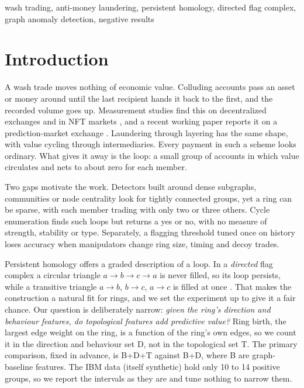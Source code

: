 \documentclass[conference]{IEEEtran}
\begin{document}
\begin{IEEEkeywords}
wash trading, anti-money laundering, persistent homology, directed flag complex, graph anomaly detection, negative results
\end{IEEEkeywords}

\section{Introduction}
\label{sec:intro}

A wash trade moves nothing of economic value. Colluding accounts pass an asset or money around until the last recipient hands it back to the first, and the recorded volume goes up. Measurement studies find this on decentralized exchanges and in NFT markets \cite{victor2021wash,tosic2025beyond,liu2023nft}, and a recent working paper reports it on a prediction-market exchange \cite{sirolly2025network}. Laundering through layering has the same shape, with value cycling through intermediaries. Every payment in such a scheme looks ordinary. What gives it away is the loop: a small group of accounts in which value circulates and nets to about zero for each member.

Two gaps motivate the work. Detectors built around dense subgraphs, communities or node centrality look for tightly connected groups, yet a ring can be sparse, with each member trading with only two or three others. Cycle enumeration finds such loops but returns a yes or no, with no measure of strength, stability or type. Separately, a flagging threshold tuned once on history loses accuracy when manipulators change ring size, timing and decoy trades.

Persistent homology offers a graded description of a loop. In a \emph{directed} flag complex a circular triangle $a\to b\to c\to a$ is never filled, so its loop persists, while a transitive triangle $a\to b$, $b\to c$, $a\to c$ is filled at once \cite{lutgehetmann2020flagser}. That makes the construction a natural fit for rings, and we set the experiment up to give it a fair chance. Our question is deliberately narrow: \emph{given the ring's direction and behaviour features, do topological features add predictive value?} Ring birth, the largest edge weight on the ring, is a function of the ring's own edges, so we count it in the direction and behaviour set D, not in the topological set T. The primary comparison, fixed in advance, is B+D+T against B+D, where B are graph-baseline features. The IBM data (itself synthetic) hold only 10 to 14 positive groups, so we report the intervals as they are and tune nothing to narrow them.
\end{document}
